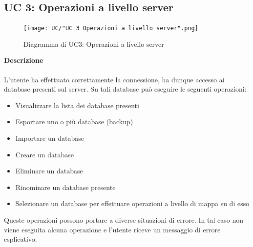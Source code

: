 \documentclass[a4paper]{article}
\begin{document}
	 \subsection{UC 3: Operazioni a livello server}
	 \begin{figure}[H]
				\centering
				\texttt{[image: UC/"UC 3 Operazioni a livello server".png]}
				\caption{Diagramma di UC3: Operazioni a livello server}
			\end{figure}
	\textbf{Descrizione} 
	\\ \\
	L'utente ha effettuato correttamente la connessione, ha dunque accesso ai database presenti sul server. Su tali database può eseguire le seguenti operazioni:
	\begin{itemize}
	\item Visualizzare la lista dei database presenti
	\item Esportare uno o più database (backup)
	\item Importare un database
	\item Creare un database
	\item Eliminare un database
	\item Rinominare un database presente
	\item Selezionare un database per effettuare operazioni a livello di mappa su di esso
	\end{itemize}
	Queste operazioni possono portare a diverse situazioni di errore. In tal caso non viene eseguita alcuna operazione e l'utente riceve un messaggio di errore esplicativo.
\end{document}
